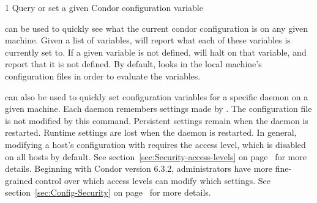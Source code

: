 \begin{ManPage}{\label{man-condor-config-val}}{1}
{Query or set a given Condor configuration variable}
\Synopsis {}










\Description

 can be used to quickly see what the current
condor configuration is on any given machine.  Given a list of
variables,  will report what each of these
variables is currently set to.  If a given variable is not defined,
 will halt on that variable, and report that it is
not defined.  By default,  looks in the local
machine's configuration files in order to evaluate the variables.

 can also be used to quickly set configuration
variables for a specific daemon on a given machine.  Each daemon
remembers settings made by .  The configuration
file is not modified by this command.  Persistent settings remain when
the daemon is restarted.  Runtime settings are lost when the daemon is
restarted.  In general, modifying a host's configuration with
requires the  access level, which is disabled on all
hosts by default.  See section~\ref{sec:Security-access-levels} on
page~\pageref{sec:Security-access-levels} for more details.
Beginning with Condor version 6.3.2, administrators have more
fine-grained control over which access levels can modify which
settings.
See section~\ref{sec:Config-Security} on
page~\pageref{sec:Config-Security} for more details.


\end{ManPage}
